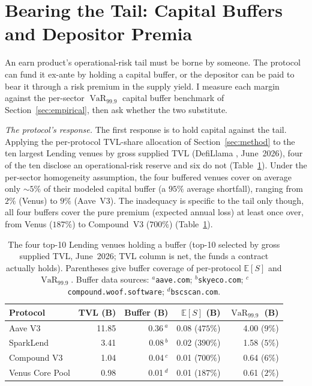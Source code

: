 \documentclass[runningheads]{llncs}
\newcommand{\E}{\mathbb{E}}
\newcommand{\VaR}{\operatorname{VaR}}
\begin{document}
\section{Bearing the Tail: Capital Buffers and Depositor Premia}\label{sec:results}

An earn product's operational-risk tail must be borne by someone.
The protocol can fund it ex-ante by holding a capital buffer, or the
depositor can be paid to bear it through a risk premium in the supply
yield. I measure each margin against the per-sector $\VaR_{99.9}$
capital buffer benchmark of Section~\ref{sec:empirical}, then ask
whether the two substitute.

\emph{The protocol's response.} The first response is to hold capital
against the tail. Applying the per-protocol TVL-share allocation of
Section~\ref{sec:method} to the ten largest Lending venues by gross supplied TVL
(DefiLlama \citep{Defillama}, June~2026), four of the ten disclose an
operational-risk reserve and six do not
(Table~\ref{tab:protocol-adequacy}). Under the per-sector homogeneity
assumption, the four buffered venues cover on average only $\sim 5\%$ of
their modeled capital buffer (a $95\%$ average shortfall), ranging from
$2\%$ (Venus) to $9\%$ (Aave~V3). The inadequacy is specific
to the tail only though, all four buffers cover the pure premium (expected annual
loss) at least once over, from Venus ($187\%$) to Compound~V3 ($700\%$)
(Table~\ref{tab:protocol-adequacy}).

\begin{table}[tb]
\centering
\caption{The four top-10 Lending venues holding a buffer (top-10
selected by gross supplied TVL, June~2026; TVL column is net, the funds a
contract actually holds). Parentheses give buffer coverage of per-protocol $\E[S]$
and $\VaR_{99.9}$. Buffer data sources: $^a$\texttt{aave.com};
$^b$\texttt{skyeco.com}; $^c$\texttt{compound.woof.software};
$^d$\texttt{bscscan.com}.}
\label{tab:protocol-adequacy}
\small
\begin{tabular}{l r r r r}
\toprule
Protocol & TVL (B) & Buffer (B) & $\E[S]$ (B) & $\VaR_{99.9}$ (B) \\
\midrule
Aave V3         & 11.85 & 0.36\,$^a$ & 0.08 ($475\%$) & 4.00 ($9\%$) \\
SparkLend       &  3.41 & 0.08\,$^b$ & 0.02 ($390\%$) & 1.58 ($5\%$) \\
Compound V3     &  1.04 & 0.04\,$^c$ & 0.01 ($700\%$) & 0.64 ($6\%$) \\
Venus Core Pool &  0.98 & 0.01\,$^d$ & 0.01 ($187\%$) & 0.61 ($2\%$) \\
\bottomrule
\end{tabular}
\end{table}
\end{document}
